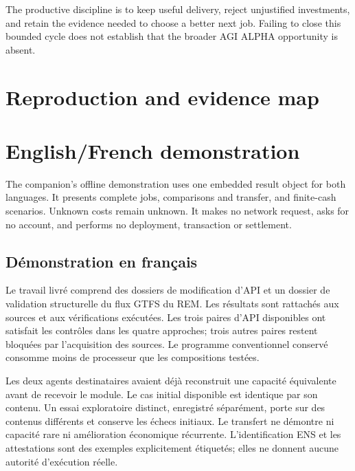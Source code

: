 \documentclass[11pt,letterpaper]{article}
\begin{document}
The productive discipline is to keep useful delivery, reject unjustified investments, and
retain the evidence needed to choose a better next job. Failing to close this bounded cycle
does not establish that the broader AGI ALPHA opportunity is absent.

\appendix
\section{Reproduction and evidence map}



\section{English/French demonstration}

The companion's offline demonstration uses one embedded result object for both languages.
It presents complete jobs, comparisons and transfer, and finite-cash scenarios. Unknown costs
remain unknown. It makes no network request, asks for no account, and performs no deployment,
transaction or settlement.

\subsection*{Démonstration en français}

Le travail livré comprend des dossiers de modification d'API et un dossier de validation
structurelle du flux GTFS du REM. Les résultats sont rattachés aux sources et aux vérifications
exécutées. Les trois paires d'API disponibles ont satisfait les contrôles dans les quatre
approches; trois autres paires restent bloquées par l'acquisition des sources. Le programme
conventionnel conservé consomme moins de processeur que les compositions testées.

Les deux agents destinataires avaient déjà reconstruit une capacité équivalente avant de
recevoir le module. Le cas initial disponible est identique par son contenu. Un essai exploratoire
distinct, enregistré séparément, porte sur des contenus différents et conserve les échecs initiaux.
Le transfert ne démontre ni capacité rare ni amélioration économique récurrente.
L'identification ENS et les attestations sont des exemples explicitement étiquetés; elles
ne donnent aucune autorité d'exécution réelle.
\end{document}
